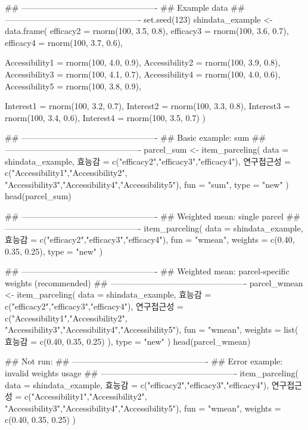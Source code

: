 \documentclass[a4paper]{book}
\begin{document}
%
\begin{Examples}
\begin{ExampleCode}
## -------------------------------------------------
## Example data
## -------------------------------------------------
set.seed(123)
shindata_example <- data.frame(
  efficacy2 = rnorm(100, 3.5, 0.8),
  efficacy3 = rnorm(100, 3.6, 0.7),
  efficacy4 = rnorm(100, 3.7, 0.6),

  Accessibility1 = rnorm(100, 4.0, 0.9),
  Accessibility2 = rnorm(100, 3.9, 0.8),
  Accessibility3 = rnorm(100, 4.1, 0.7),
  Accessibility4 = rnorm(100, 4.0, 0.6),
  Accessibility5 = rnorm(100, 3.8, 0.9),

  Interest1 = rnorm(100, 3.2, 0.7),
  Interest2 = rnorm(100, 3.3, 0.8),
  Interest3 = rnorm(100, 3.4, 0.6),
  Interest4 = rnorm(100, 3.5, 0.7)
)

## -------------------------------------------------
## Basic example: sum
## -------------------------------------------------
parcel_sum <- item_parceling(
  data = shindata_example,
  효능감 = c("efficacy2","efficacy3","efficacy4"),
  연구접근성 = c("Accessibility1","Accessibility2",
                  "Accessibility3","Accessibility4","Accessibility5"),
  fun = "sum",
  type = "new"
)
head(parcel_sum)

## -------------------------------------------------
## Weighted mean: single parcel
## -------------------------------------------------
item_parceling(
  data = shindata_example,
  효능감 = c("efficacy2","efficacy3","efficacy4"),
  fun = "wmean",
  weights = c(0.40, 0.35, 0.25),
  type = "new"
)

## -------------------------------------------------
## Weighted mean: parcel-specific weights (recommended)
## -------------------------------------------------
parcel_wmean <- item_parceling(
  data = shindata_example,
  효능감 = c("efficacy2","efficacy3","efficacy4"),
  연구접근성 = c("Accessibility1","Accessibility2",
                  "Accessibility3","Accessibility4","Accessibility5"),
  fun = "wmean",
  weights = list(
    효능감 = c(0.40, 0.35, 0.25)
  ),
  type = "new"
)
head(parcel_wmean)

## Not run: 
## -------------------------------------------------
## Error example: invalid weights usage
## -------------------------------------------------
item_parceling(
  data = shindata_example,
  효능감 = c("efficacy2","efficacy3","efficacy4"),
  연구접근성 = c("Accessibility1","Accessibility2",
                  "Accessibility3","Accessibility4","Accessibility5"),
  fun = "wmean",
  weights = c(0.40, 0.35, 0.25)
)


\end{ExampleCode}
\end{Examples}
\end{document}
